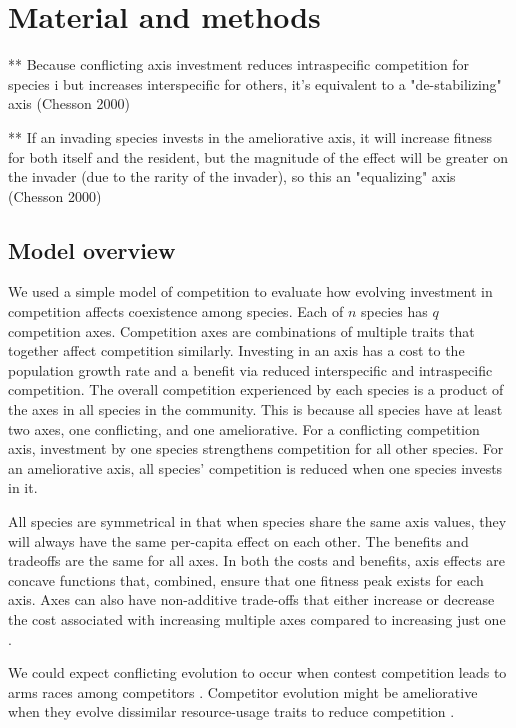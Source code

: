 
\section*{Material and methods}


** Because conflicting axis investment reduces intraspecific competition for 
species i but increases interspecific for others, it's equivalent to a
"de-stabilizing" axis (Chesson 2000)

** If an invading species invests in the ameliorative axis,
it will increase fitness for both itself and the resident,
but the magnitude of the effect will be greater on the invader
(due to the rarity of the invader),
so this an "equalizing" axis (Chesson 2000)


\subsection*{Model overview}

We used a simple model of competition to evaluate how evolving investment in 
competition affects coexistence among species.
Each of $n$ species has $q$ competition axes.
Competition axes are combinations of multiple traits that together affect 
competition similarly.
Investing in an axis has a cost to the population growth rate and 
a benefit via reduced interspecific and intraspecific competition.
The overall competition experienced by each species is a product of 
the axes in all species in the community.
This is because all species have at least two axes, 
one conflicting, and one ameliorative.
For a conflicting competition axis, investment by one species 
strengthens competition for all other species.
For an ameliorative axis, all species' competition is reduced when
one species invests in it.


All species are symmetrical in that when species share the same axis 
values, they will always have the same per-capita effect on each other.
The benefits and tradeoffs are the same for all axes.
In both the costs and benefits, axis effects are concave functions that,
combined, ensure that one fitness peak exists for each axis.
Axes can also have non-additive trade-offs that either increase or decrease
the cost associated with increasing multiple axes compared to increasing
just one \citep{Northfield2021}.

We could expect conflicting evolution to occur when contest competition
leads to arms races among competitors
\citep{Abrams1994}.
Competitor evolution might be ameliorative when they evolve
dissimilar resource-usage traits to reduce competition \citep{Roughgarden1976}.


